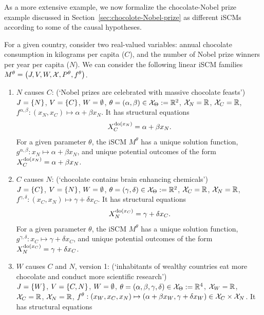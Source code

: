 As a more extensive example, we now formalize the chocolate-Nobel prize example discussed in Section~\ref{sec:chocolote-Nobel-prize} as different iSCMs according to some of the causal hypotheses.
\begin{Eg}\label{ex:scms_formal}
  For a given country, consider two real-valued variables: annual chocolate consumption in kilograms per capita ($C$), and the number of Nobel prize winners per year per capita ($N$).
  We can consider the following linear iSCM families $M^{\theta} = \left ( J, V, W, \mathcal{X}, P^\theta, f^\theta \right )$. 
  \begin{enumerate}
    \item $N$ causes $C$: (`Nobel prizes are celebrated with massive chocolate feasts')\\
      $J = \{N\}$, $V = \{C\}$, $W = \emptyset$, $\theta = (\alpha,\beta) \in \mathcal{X}_{\Theta} := \mathbb{R}^2$, 
      $\mathcal{X}_N = \mathbb{R}$, $\mathcal{X}_C = \mathbb{R}$, $f^{\alpha,\beta} : (x_N,x_C) \mapsto \alpha + \beta x_N$.
      It has structural equations
      $$X_C^{\operatorname{do}(x_N)} = \alpha + \beta x_N.$$
      For a given parameter $\theta$, the iSCM $M^{\theta}$ has 
      a unique solution function, $g^{\alpha,\beta} : x_N \mapsto \alpha + \beta x_N$, and
      unique potential outcomes of the form $X_C^{\operatorname{do}(x_N)} = \alpha + \beta x_N$.
    \item $C$ causes $N$: (`chocolate contains brain enhancing chemicals')\\
      $J = \{C\}$, $V = \{N\}$, $W = \emptyset$, $\theta = (\gamma,\delta) \in \mathcal{X}_\Theta := \mathbb{R}^2$, 
      $\mathcal{X}_C = \mathbb{R}$, $\mathcal{X}_N = \mathbb{R}$, $f^{\gamma,\delta} : (x_C,x_N) \mapsto \gamma + \delta x_C$.
      It has structural equations
      $$X_N^{\operatorname{do}(x_C)} = \gamma + \delta x_C.$$
      For a given parameter $\theta$, the iSCM $M^{\theta}$ has 
      a unique solution function, $g^{\gamma,\delta} : x_C \mapsto \gamma + \delta x_C$, and
      unique potential outcomes of the form $X_N^{\operatorname{do}(x_C)} = \gamma + \delta x_C$.
    \item $W$ causes $C$ and $N$, version 1: (`inhabitants of wealthy countries eat more chocolate and conduct more scientific research')\\
      $J = \{W\}$, $V = \{C,N\}$, $W = \emptyset$, $\theta = (\alpha,\beta,\gamma,\delta) \in \mathcal{X}_\Theta := \mathbb{R}^4$, 
      $\mathcal{X}_W = \mathbb{R}$, $\mathcal{X}_C = \mathbb{R}$, $\mathcal{X}_N = \mathbb{R}$, $f^{\theta} : (x_W,x_C,x_N) \mapsto (\alpha + \beta x_W, \gamma + \delta x_W) \in \mathcal{X}_C \times \mathcal{X}_N$.
      It has structural equations
      \begin{align*}

\end{align*}
\end{enumerate}
\end{Eg}

